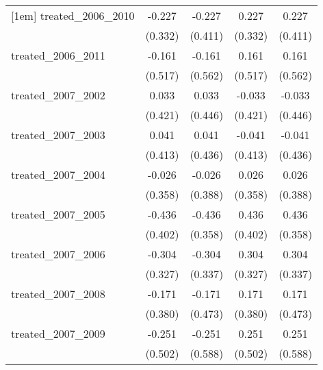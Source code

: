 {\begin{tabular}{l*{4}{c}}
[1em]
treated\_2006\_2010&      -0.227         &      -0.227         &       0.227         &       0.227         \\
            &     (0.332)         &     (0.411)         &     (0.332)         &     (0.411)         \\
[1em]
treated\_2006\_2011&      -0.161         &      -0.161         &       0.161         &       0.161         \\
            &     (0.517)         &     (0.562)         &     (0.517)         &     (0.562)         \\
[1em]
treated\_2007\_2002&       0.033         &       0.033         &      -0.033         &      -0.033         \\
            &     (0.421)         &     (0.446)         &     (0.421)         &     (0.446)         \\
[1em]
treated\_2007\_2003&       0.041         &       0.041         &      -0.041         &      -0.041         \\
            &     (0.413)         &     (0.436)         &     (0.413)         &     (0.436)         \\
[1em]
treated\_2007\_2004&      -0.026         &      -0.026         &       0.026         &       0.026         \\
            &     (0.358)         &     (0.388)         &     (0.358)         &     (0.388)         \\
[1em]
treated\_2007\_2005&      -0.436         &      -0.436         &       0.436         &       0.436         \\
            &     (0.402)         &     (0.358)         &     (0.402)         &     (0.358)         \\
[1em]
treated\_2007\_2006&      -0.304         &      -0.304         &       0.304         &       0.304         \\
            &     (0.327)         &     (0.337)         &     (0.327)         &     (0.337)         \\
[1em]
treated\_2007\_2008&      -0.171         &      -0.171         &       0.171         &       0.171         \\
            &     (0.380)         &     (0.473)         &     (0.380)         &     (0.473)         \\
[1em]
treated\_2007\_2009&      -0.251         &      -0.251         &       0.251         &       0.251         \\
            &     (0.502)         &     (0.588)         &     (0.502)         &     (0.588)         \\

\end{tabular}}
